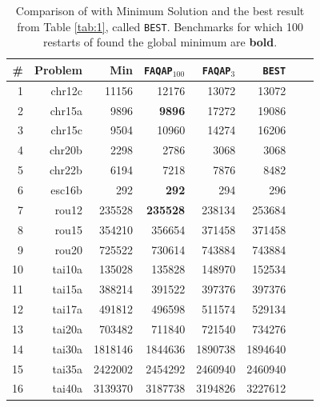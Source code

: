 \documentclass[10pt,journal,cspaper,compsoc]{IEEEtran}
\begin{document}
\begin{table}[h!]
\caption{Comparison of \faqap with Minimum Solution and the best result from Table \ref{tab:1}, called \texttt{BEST}.  Benchmarks for which 100 restarts of \faqap found the global minimum are \textbf{bold}.}
\begin{center}
\begin{tabular}{|r|r|r||r|r|r|r|r|}
\hline
\# & Problem  &   Min    & \texttt{FAQAP}$_{100}$ & \texttt{FAQAP}$_{3}$ & \texttt{BEST} \\
\hline
1&    chr12c &   11156 &   12176 &   13072 &     13072 \\
2&    chr15a &    9896 &    \textbf{9896} &   17272 &      19086 \\
3&    chr15c &    9504 &   10960 &   14274 &      16206 \\
4&   chr20b &    2298 &    2786 &    3068 &        3068 \\
5&    chr22b &    6194 &    7218 &    7876 &       8482 \\
6&    esc16b &     292 &     \textbf{292} &     294 &        296 \\
7&     rou12 &  235528 &  \textbf{235528} &  238134 &    253684 \\
8&     rou15 &  354210 &  356654 &  371458 &    371458 \\
9&     rou20 &  725522 &  730614 &  743884 &    743884 \\
10&    tai10a &  135028 &  135828 &  148970 &    152534 \\
11&    tai15a &  388214 &  391522 &  397376 &    397376 \\
12&    tai17a &  491812 &  496598 &  511574 &    529134 \\
13&    tai20a &  703482 &  711840 &  721540 &    734276 \\
14&    tai30a & 1818146 & 1844636 & 1890738 &  1894640 \\
15&    tai35a & 2422002 & 2454292 & 2460940 &  2460940 \\
16&    tai40a & 3139370 & 3187738 & 3194826 &  3227612 \\
    \hline
\end{tabular}
\end{center}
\label{tab:2}
\end{table}%


% 
\end{document}
